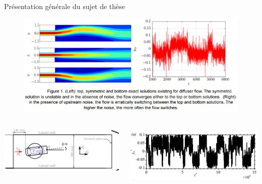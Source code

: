 \documentclass{beamer}
\begin{document}
\begin{frame}{Présentation générale du sujet de thèse}
    \begin{figure}
    \centering
        \includegraphics[height=.35\textheight]{images/phenomene_bistable.jpg}
    \end{figure}
    \vspace{20pt}
    \begin{columns}
        \begin{column}{0.49\textwidth}
            \centering
            \includegraphics[width = \textwidth]{images/dispositif_bifurcation_experimental.jpg}
        \end{column}
        \begin{column}{0.49\textwidth}
            \centering
            \includegraphics[width = \textwidth]{images/barycentre_pression_bifurcation_experimental.jpg}
        \end{column}
    \end{columns}
\end{frame}
\end{document}
